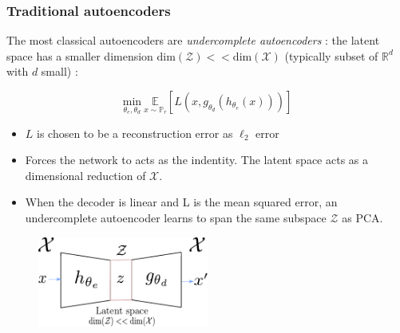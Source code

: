 \documentclass[french,9pt]{beamer}
\begin{document}
\begin{frame}
\frametitle{Traditional autoencoders}

The most classical autoencoders are \emph{undercomplete autoencoders} : the latent space has a smaller dimension $\text{dim}(\mathcal{Z}) << \text{dim}(\mathcal{X})$ (typically subset of $\mathbb{R}^{d}$ with $d$ small) : 


\begin{equation}
\label{autoencoderclassical}
\underset{\theta_{e},\theta_{d}}{\text{min}} \ \underset{x \sim \mathbb{P}_{r}}{\mathbb{E}}[L(x,g_{\theta_{d}}(h_{\theta_{e}}(x)))]
\end{equation}

\begin{itemize}
\item $L$ is chosen to be a reconstruction error as $\ell_{2}$ error
\item Forces the network to acts as the indentity. The latent space acts as a dimensional reduction of $\mathcal{X}$.
\item When the decoder is linear and L is the mean squared error, an undercomplete autoencoder learns to span the same subspace $\mathcal{Z}$ as PCA.
\end{itemize}


\begin{figure}
\label{autoencodeurfig}
\centering
    \includegraphics[width=0.5\textwidth]{fig/autoencoder.pdf}
\end{figure}

\end{frame}

\end{document}

